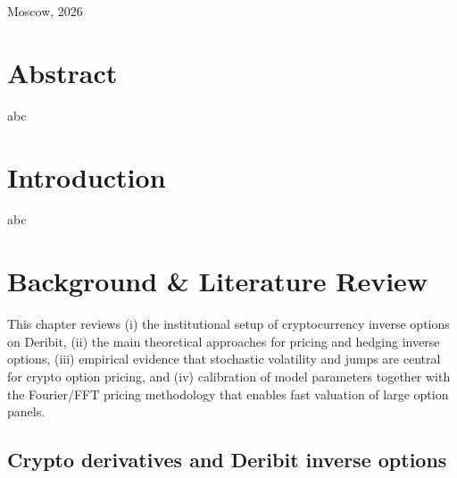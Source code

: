 \documentclass[a4paper,titlepage,12pt]{report}
\theoremstyle{plain}
\begin{document}

\justifying



\vspace{70mm}

\begin{center}
Moscow, 2026
\end{center}


\newpage 
\pagestyle{plain}






\clearpage
\newpage
{}
\chapter*{Abstract}
abc

\setcounter{tocdepth}{1}
\tableofcontents


\chapter*{Introduction}
abc






\chapter{Background \& Literature Review}\label{ch:litreview}

This chapter reviews (i) the institutional setup of cryptocurrency inverse options on Deribit,
(ii) the main theoretical approaches for pricing and hedging inverse options,
(iii) empirical evidence that stochastic volatility and jumps are central for crypto option pricing, and (iv) calibration of model parameters together with the Fourier/FFT pricing methodology that enables fast valuation of large option panels.

\section{Crypto derivatives and Deribit inverse options}\label{sec:deribit_inverse}
\end{document}
